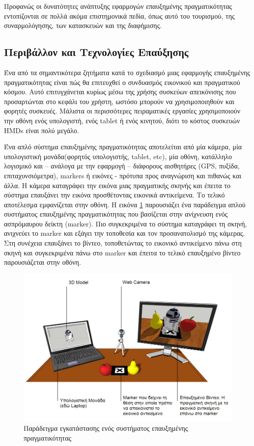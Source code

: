 Προφανώς οι δυνατότητες ανάπτυξης εφαρμογών επαυξημένης πραγματικότητας εντοπίζονται σε πολλά ακόμα επιστημονικά πεδία, όπως αυτό του τουρισμού, της συναρμολόγησης, των κατασκευών και της διαφήμισης.



\subsection{Περιβάλλον και Τεχνολογίες Επαύξησης}
Ένα από τα σημαντικότερα ζητήματα κατά το σχεδιασμό μιας εφαρμογής επαυξημένης πραγματικότητας είναι πώς θα επιτευχθεί ο συνδυασμός εικονικού και πραγματικού κόσμου. Αυτό επιτυγχάνεται κυρίως μέσω της χρήσης συσκεύων απεικόνισης που προσαρτώνται στο κεφάλι του χρήστη, ωστόσο μπορούν να χρησιμοποιηθούν και φορητές συσκευές.
Μάλιστα οι περισσότερες πειραματικές εργασίες χρησιμοποιούν την οθόνη ενός υπολογιστή, ενός tablet ή ενός κινητού, διότι το κόστος συσκευών HMDs είναι πολύ μεγάλο. 

Ένα απλό σύστημα επαυξημένης πραγματικότητας αποτελείται από μία κάμερα, μία υπολογιστική μονάδα(φορητός υπολογιστής, tablet, etc), μία οθόνη, κατάλληλο λογισμικό και – ανάλογα με την εφαρμογή – διάφορους αισθητήρες (GPS, πυξίδα, επιταχυνσιόμετρα), markers ή εικόνες - πρότυπα προς αναγνώριση και πιθανώς και άλλα.
Η κάμερα καταγράφει την εικόνα μιας πραγματικής σκηνής και έπειτα το σύστημα επαυξάνει την εικόνα προσθέτοντας εικονικά αντικείμενα. Το τελικό αποτέλεσμα εμφανίζεται στην οθόνη.
Η εικόνα \ref{fig:ar_example} παρουσιάζει ένα παράδειγμα απλού συστήματος επαυξημένης πραγματικότητας που βασίζεται στην ανίχνευση ενός ασπρόμαυρου δείκτη (marker).
Πιο συγκεκριμένα το σύστημα καταγράφει τη σκηνή, ανιχνεύει το marker και εξάγει την τοποθεσία και τον προσανατολισμό της κάμερας. Στη συνέχεια επαυξάνει το βίντεο, τοποθετώντας το εικονικό αντικείμενο πάνω στη σκηνή και συγκεκριμένα πάνω στο marker και έπειτα το τελικό επαυξημένο βίντεο παρουσιάζεται στην οθόνη.


\begin{figure}[H]
    \centering
    \includegraphics[scale=0.3, angle=0]{Files/Figures/ar_system_example.jpg}
    \caption[Παράδειγμα εγκατάστασης ενός συστήματος επαυξημένης πραγματικότητας ]{ Παράδειγμα εγκατάστασης ενός συστήματος επαυξημένης πραγματικότητας \cite{ar_example}}
    \label{fig:ar_example}
\end{figure}


